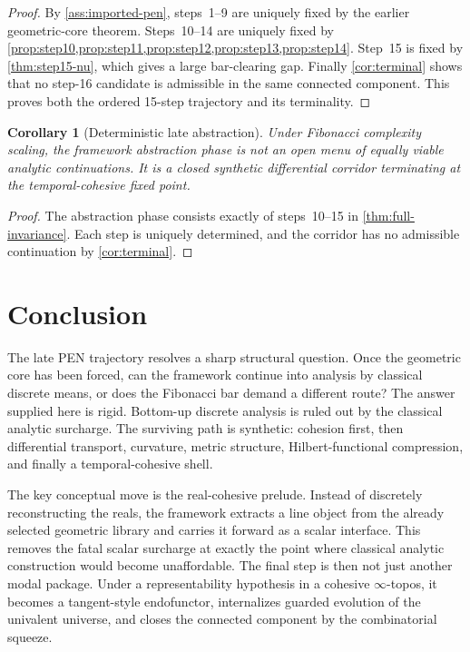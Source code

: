 \documentclass[11pt]{article}
\theoremstyle{plain}
\newtheorem{corollary}[theorem]{Corollary}
\theoremstyle{definition}
\theoremstyle{remark}
\begin{document}
\begin{proof}
By \cref{ass:imported-pen}, steps~1--9 are uniquely fixed by the earlier geometric-core theorem. Steps~10--14 are uniquely fixed by \cref{prop:step10,prop:step11,prop:step12,prop:step13,prop:step14}. Step~15 is fixed by \cref{thm:step15-nu}, which gives a large bar-clearing gap. Finally \cref{cor:terminal} shows that no step-16 candidate is admissible in the same connected component. This proves both the ordered 15-step trajectory and its terminality.
\end{proof}

\begin{corollary}[Deterministic late abstraction]
\label{cor:deterministic-late}
Under Fibonacci complexity scaling, the framework abstraction phase is not an open menu of equally viable analytic continuations. It is a closed synthetic differential corridor terminating at the temporal-cohesive fixed point.
\end{corollary}

\begin{proof}
The abstraction phase consists exactly of steps~10--15 in \cref{thm:full-invariance}. Each step is uniquely determined, and the corridor has no admissible continuation by \cref{cor:terminal}.
\end{proof}

\section{Conclusion}

The late PEN trajectory resolves a sharp structural question. Once the geometric core has been forced, can the framework continue into analysis by classical discrete means, or does the Fibonacci bar demand a different route? The answer supplied here is rigid. Bottom-up discrete analysis is ruled out by the classical analytic surcharge. The surviving path is synthetic: cohesion first, then differential transport, curvature, metric structure, Hilbert-functional compression, and finally a temporal-cohesive shell.

The key conceptual move is the real-cohesive prelude. Instead of discretely reconstructing the reals, the framework extracts a line object from the already selected geometric library and carries it forward as a scalar interface. This removes the fatal scalar surcharge at exactly the point where classical analytic construction would become unaffordable. The final step is then not just another modal package. Under a representability hypothesis in a cohesive $\infty$-topos, it becomes a tangent-style endofunctor, internalizes guarded evolution of the univalent universe, and closes the connected component by the combinatorial squeeze.
\end{document}
